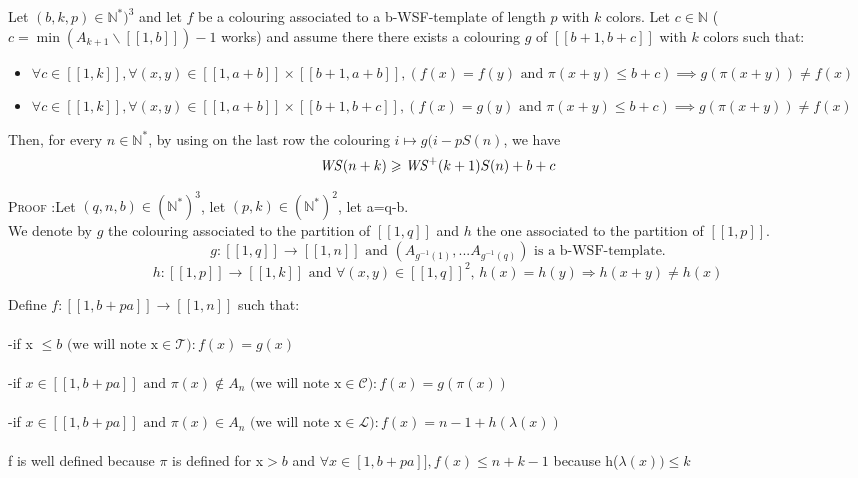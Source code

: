 \begin{proposition}
Let \((b, k, p) \in \mathbb{N}^*)^3\) and let \(f\) be a colouring associated to a b-WSF-template of length \(p\) with \(k\) colors. Let
\(c \in \mathbb{N}\) (\(c = \min (A_{k+1} \backslash [\![1, b ]\!]) - 1\) works) and assume there there exists a colouring \(g\) of
\([\![b + 1, b + c]\!]\) with \(k\) colors such that:
\begin{itemize}
	\item \(\forall c \in [\![1, k]\!], \forall (x, y) \in  [\![1, a + b]\!] \times  [\![b + 1, a + b]\!], (f(x) = f(y) \text{ and } \pi(x + y) \leqslant b + c)
	\implies g(\pi(x + y)) \neq f(x)\)
	\item \(\forall c \in [\![1, k]\!], \forall (x, y) \in  [\![1, a + b]\!] \times  [\![b + 1, b + c]\!],  (f(x) = g(y) \text{ and } \pi(x + y) \leqslant b + c)
\implies g(\pi(x + y)) \neq f(x)\)
\end{itemize}
Then, for every \(n \in \mathbb{N}^*\), by using on the last row the colouring \(i \longmapsto g(i - p S(n)\), we have\\
\[ \mathit{WS}(n+k) \geqslant \mathit{WS}^+(k+1) S(n) + b + c\]
\end{proposition}

\textsc{Proof :}Let \((q,n,b) \in (\mathbb{N}^*)^3\), let \( (p,k) \in (\mathbb{N}^*)^2\), let a=q-b. \\
We denote by \(g\) the colouring associated to the partition of \([\![1,q]\!]\) and \(h\) the
one associated to the partition of \([\![1,p]\!]\).
\[ g : [\![1,q]\!] \longrightarrow [\![1,n]\!] \text{ and } (A_{g^{-1}(1)},...A_{g^{-1}(q)})\text{ is a b-WSF-template.}
\]
\[h : [\![1,p]\!] \longrightarrow [\![1,k]\!] \text{ and } \forall (x,y) \in [\![1,q]\!]^2 \text{, } h(x) = h(y)
\Longrightarrow h(x+y) \neq h(x)
\]

Define \( f : [\![1,b+pa]\!] \longrightarrow [\![1,n]\!] \) such that:
\\\\-if x \(\leqslant b \text{ (we will note x} \in \mathcal{T}): f(x)=g(x)\)
\\\\-if \( x \in [\![1,b+pa]\!] \text{ and } \pi(x) \notin A_n \text{ (we will note x} \in \mathcal{C}): f(x)=g(\pi(x))\)
\\\\-if \( x \in [\![1,b+pa]\!]  \text{ and }\pi(x) \in A_n \text{ (we will note x} \in \mathcal{L}): f(x)=n-1+h(\lambda(x))\)
\\\\
f is well defined because \(\pi\) is defined for x\(>b\) and \(\forall x \in \![1,b+pa]\!], f(x)\leqslant n+k-1\) because h(\(\lambda(x))\leqslant k\)

